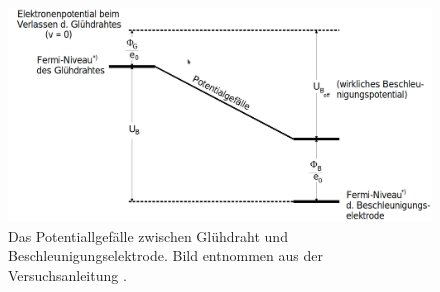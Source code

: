\begin{figure}
    \centering
    \includegraphics[width=\textwidth]{content/data/Potentialgefaelle.png}
    \caption{Das Potentiallgefälle zwischen Glühdraht und Beschleunigungselektrode. Bild entnommen aus der Versuchsanleitung \cite[5]{anleitung}.}
    \label{fig:potential}
\end{figure}


